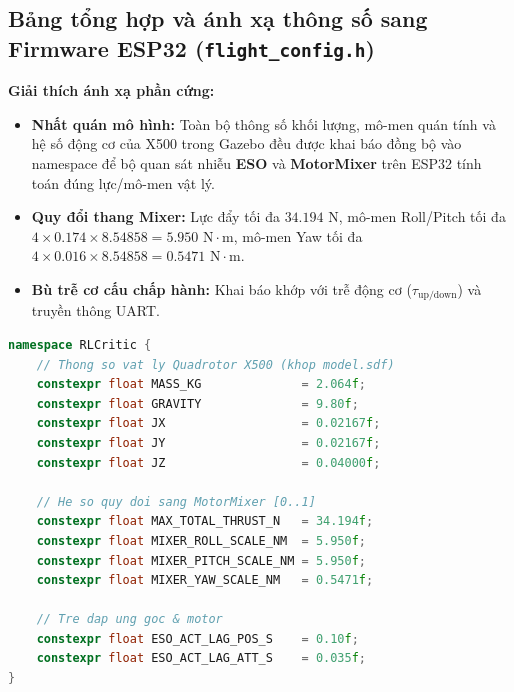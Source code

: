 \documentclass[11pt,a4paper]{article}
\begin{document}
\subsection{Bảng tổng hợp và ánh xạ thông số sang Firmware ESP32 (\texttt{flight\_config.h})}
\noindent
\begin{minipage}[t]{0.45\textwidth}
\vspace{0pt}
\textbf{Giải thích ánh xạ phần cứng:}
\begin{itemize}
    \item \textbf{Nhất quán mô hình:} Toàn bộ thông số khối lượng, mô-men quán tính và hệ số động cơ của X500 trong Gazebo đều được khai báo đồng bộ vào namespace  để bộ quan sát nhiễu \textbf{ESO} và \textbf{MotorMixer} trên ESP32 tính toán đúng lực/mô-men vật lý.
    \item \textbf{Quy đổi thang Mixer:} Lực đẩy tối đa $34.194\text{ N}$, mô-men Roll/Pitch tối đa $4 \times 0.174 \times 8.54858 = 5.950\text{ N}\cdot\text{m}$, mô-men Yaw tối đa $4 \times 0.016 \times 8.54858 = 0.5471\text{ N}\cdot\text{m}$.
    \item \textbf{Bù trễ cơ cấu chấp hành:} Khai báo  khớp với trễ động cơ ($\tau_{\text{up/down}}$) và truyền thông UART.
\end{itemize}
\end{minipage}
\hfill
\begin{minipage}[t]{0.52\textwidth}
\vspace{0pt}
\begin{lstlisting}[language=C++, firstnumber=150]
namespace RLCritic {
    // Thong so vat ly Quadrotor X500 (khop model.sdf)
    constexpr float MASS_KG              = 2.064f;
    constexpr float GRAVITY              = 9.80f;
    constexpr float JX                   = 0.02167f;
    constexpr float JY                   = 0.02167f;
    constexpr float JZ                   = 0.04000f;

    // He so quy doi sang MotorMixer [0..1]
    constexpr float MAX_TOTAL_THRUST_N   = 34.194f;
    constexpr float MIXER_ROLL_SCALE_NM  = 5.950f;
    constexpr float MIXER_PITCH_SCALE_NM = 5.950f;
    constexpr float MIXER_YAW_SCALE_NM   = 0.5471f;

    // Tre dap ung goc & motor
    constexpr float ESO_ACT_LAG_POS_S    = 0.10f;
    constexpr float ESO_ACT_LAG_ATT_S    = 0.035f;
}
\end{lstlisting}
\end{minipage}
\end{document}
